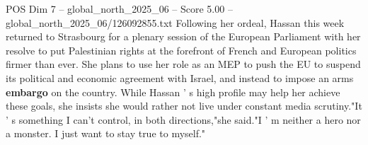 \begin{textsample}{POS Dim 7 – global\_north\_2025\_06 – Score 5.00 – global\_north\_2025\_06/126092855.txt}
Following her ordeal, Hassan this week returned to Strasbourg for a plenary session of the European Parliament with her resolve to put Palestinian rights at the forefront of French and European politics firmer than ever.
She plans to use her role as an MEP to push the EU to suspend its political and economic agreement with Israel, and instead to impose an arms \textbf{embargo} on the country.
While Hassan ' s high profile may help her achieve these goals, she insists she would rather not live under constant media scrutiny."It ' s something I can't control, in both directions,"she said."I ' m neither a hero nor a monster.
I just want to stay true to myself."

\end{textsample}
